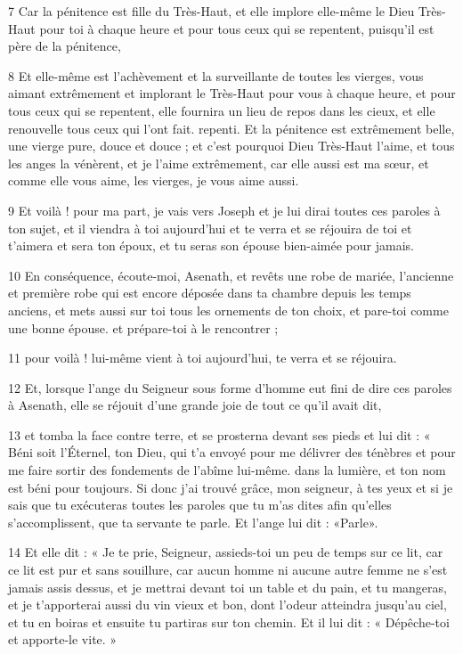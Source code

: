 \par 7 Car la pénitence est fille du Très-Haut, et elle implore elle-même le Dieu Très-Haut pour toi à chaque heure et pour tous ceux qui se repentent, puisqu'il est père de la pénitence,

\par 8 Et elle-même est l'achèvement et la surveillante de toutes les vierges, vous aimant extrêmement et implorant le Très-Haut pour vous à chaque heure, et pour tous ceux qui se repentent, elle fournira un lieu de repos dans les cieux, et elle renouvelle tous ceux qui l'ont fait. repenti. Et la pénitence est extrêmement belle, une vierge pure, douce et douce ; et c'est pourquoi Dieu Très-Haut l'aime, et tous les anges la vénèrent, et je l'aime extrêmement, car elle aussi est ma sœur, et comme elle vous aime, les vierges, je vous aime aussi.

\par 9 Et voilà ! pour ma part, je vais vers Joseph et je lui dirai toutes ces paroles à ton sujet, et il viendra à toi aujourd'hui et te verra et se réjouira de toi et t'aimera et sera ton époux, et tu seras son épouse bien-aimée pour jamais.

\par 10 En conséquence, écoute-moi, Asenath, et revêts une robe de mariée, l'ancienne et première robe qui est encore déposée dans ta chambre depuis les temps anciens, et mets aussi sur toi tous les ornements de ton choix, et pare-toi comme une bonne épouse. et prépare-toi à le rencontrer ;

\par 11 pour voilà ! lui-même vient à toi aujourd'hui, te verra et se réjouira.

\par 12 Et, lorsque l'ange du Seigneur sous forme d'homme eut fini de dire ces paroles à Asenath, elle se réjouit d'une grande joie de tout ce qu'il avait dit,

\par 13 et tomba la face contre terre, et se prosterna devant ses pieds et lui dit : « Béni soit l'Éternel, ton Dieu, qui t'a envoyé pour me délivrer des ténèbres et pour me faire sortir des fondements de l'abîme lui-même. dans la lumière, et ton nom est béni pour toujours. Si donc j'ai trouvé grâce, mon seigneur, à tes yeux et si je sais que tu exécuteras toutes les paroles que tu m'as dites afin qu'elles s'accomplissent, que ta servante te parle. Et l'ange lui dit : «Parle».

\par 14 Et elle dit : « Je te prie, Seigneur, assieds-toi un peu de temps sur ce lit, car ce lit est pur et sans souillure, car aucun homme ni aucune autre femme ne s'est jamais assis dessus, et je mettrai devant toi un table et du pain, et tu mangeras, et je t'apporterai aussi du vin vieux et bon, dont l'odeur atteindra jusqu'au ciel, et tu en boiras et ensuite tu partiras sur ton chemin. Et il lui dit : « Dépêche-toi et apporte-le vite. »

